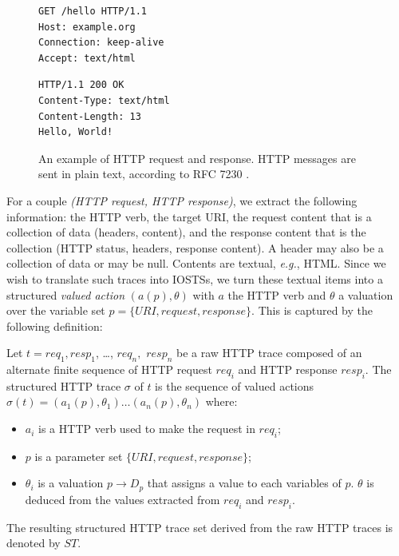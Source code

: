 \begin{figure}[ht]
\begin{framed}
\begin{BVerbatim}
GET /hello HTTP/1.1
Host: example.org
Connection: keep-alive
Accept: text/html
\end{BVerbatim}
\end{framed}

\begin{framed}
\begin{BVerbatim}
HTTP/1.1 200 OK
Content-Type: text/html
Content-Length: 13
Hello, World!
\end{BVerbatim}
\end{framed}

    \caption{An example of HTTP request and response. HTTP messages
    are sent in plain text, according to RFC 7230 \cite{RFC7230}.}
    \label{fig:httpexample}
\end{figure}

For a couple \textit{(HTTP request, HTTP response)}, we extract
the following information: the HTTP verb, the target URI, the
request content that is a collection of data (headers, content),
and the response content that is the collection (HTTP status,
headers, response content). A header may also be a collection of
data or may be null. Contents are textual, \emph{e.g.}, HTML.
Since we wish to translate such traces into IOSTSs, we turn these
textual items into a structured \emph{valued action}
$(a(p),\theta)$ with $a$ the HTTP verb and $\theta$ a valuation
over the variable set $p=\{URI,request,response\}$. This is
captured by the following definition:

\begin{definition} Let $t=
req_1,resp_1$, \dots, $req_n,$ $resp_n$ be a raw HTTP trace
composed of an alternate finite sequence of HTTP request $req_i$
and HTTP response $resp_i$. The structured HTTP trace $\sigma$ of
$t$ is the sequence of valued actions $\sigma(t) =
(a_1(p),\theta_1) \dots (a_n(p),\theta_n)$ where:

\begin{itemize}
    \item $a_i$ is a HTTP verb used to make the request in
        $req_i$;

    \item $p$ is a parameter set $\{URI, request, response\}$;

    \item $\theta_i$ is a valuation $p \rightarrow D_p$ that
        assigns a value to each variables of $p$.  $\theta$ is
        deduced from the values extracted from $req_i$ and
        $resp_i$.
\end{itemize}

The resulting structured HTTP trace set derived from the raw HTTP
traces is denoted by $ST$.

    \label{def:structured-http-traces}
\end{definition}

